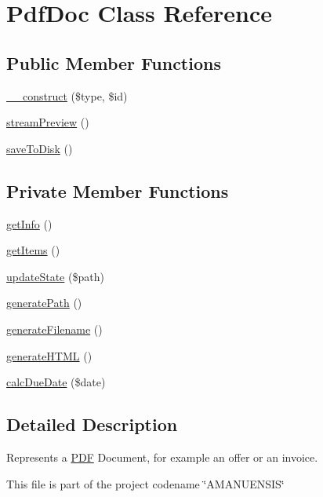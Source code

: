 \hypertarget{a00034}{}\section{Pdf\+Doc Class Reference}
\label{a00034}
\subsection*{Public Member Functions}
\begin{DoxyCompactItemize}
\item 
\hyperlink{a00034_ab838a22786c540b6b0dd5eb7b4f16451}{\+\_\+\+\_\+construct} (\$type, \$id)
\item 
\hyperlink{a00034_ac577e3777381a2b1616704cbefcec054}{stream\+Preview} ()
\item 
\hyperlink{a00034_a980f4ff9366e30bbc593223f606a6ec1}{save\+To\+Disk} ()
\end{DoxyCompactItemize}
\subsection*{Private Member Functions}
\begin{DoxyCompactItemize}
\item 
\hyperlink{a00034_a164026f74736817927e1cacd282a2e28}{get\+Info} ()
\item 
\hyperlink{a00034_ab20ac3660e2d867b235b004bd3950ec3}{get\+Items} ()
\item 
\hyperlink{a00034_a8e1c644fb3127a75be9e7b36e4ef6e79}{update\+State} (\$path)
\item 
\hyperlink{a00034_adb5455ba3678cc7d0333ba3e6c1f5e9b}{generate\+Path} ()
\item 
\hyperlink{a00034_a8bad07be942d56e97c7a6cf4bd17e02b}{generate\+Filename} ()
\item 
\hyperlink{a00034_a423e6fdd1402abf321e7e93a5d2d2f7b}{generate\+H\+T\+M\+L} ()
\item 
\hyperlink{a00034_a3dae5b4b218ecd93ab366f3176d166c5}{calc\+Due\+Date} (\$date)
\end{DoxyCompactItemize}


\subsection{Detailed Description}
Represents a \hyperlink{a00033}{P\+D\+F} Document, for example an offer or an invoice.

This file is part of the project codename \char`\"{}\+A\+M\+A\+N\+U\+E\+N\+S\+I\+S\char`\"{}

